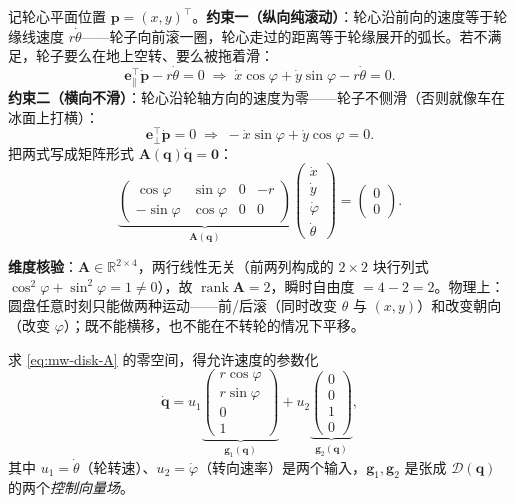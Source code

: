 \begin{derivation}[单轮圆盘的两条纯滚动约束]
记轮心平面位置 $\mathbf{p}=(x,y)^\top$。\textbf{约束一（纵向纯滚动）}：轮心沿前向的速度等于轮缘线速度 $r\dot\theta$——轮子向前滚一圈，轮心走过的距离等于轮缘展开的弧长。若不满足，轮子要么在地上空转、要么被拖着滑：
\begin{equation}
  \mathbf{e}_\parallel^\top\dot{\mathbf{p}}-r\dot\theta=0
  \;\Longrightarrow\;
  \dot x\cos\varphi+\dot y\sin\varphi-r\dot\theta=0.
  \label{eq:mw-disk-roll}
\end{equation}
\textbf{约束二（横向不滑）}：轮心沿轮轴方向的速度为零——轮子不侧滑（否则就像车在冰面上打横）：
\begin{equation}
  \mathbf{e}_\perp^\top\dot{\mathbf{p}}=0
  \;\Longrightarrow\;
  -\dot x\sin\varphi+\dot y\cos\varphi=0.
  \label{eq:mw-disk-noslip}
\end{equation}
把两式写成矩阵形式 $\mathbf{A}(\mathbf{q})\dot{\mathbf{q}}=\mathbf{0}$：
\begin{equation}
  \underbrace{\begin{pmatrix}\cos\varphi&\sin\varphi&0&-r\\-\sin\varphi&\cos\varphi&0&0\end{pmatrix}}_{\mathbf{A}(\mathbf{q})}
  \begin{pmatrix}\dot x\\\dot y\\\dot\varphi\\\dot\theta\end{pmatrix}=\begin{pmatrix}0\\0\end{pmatrix}.
  \label{eq:mw-disk-A}
\end{equation}
\end{derivation}

\noindent\textbf{维度核验}：$\mathbf{A}\in\mathbb{R}^{2\times4}$，两行线性无关（前两列构成的 $2\times2$ 块行列式 $\cos^2\varphi+\sin^2\varphi=1\neq0$），故 $\operatorname{rank}\mathbf{A}=2$，瞬时自由度 $=4-2=2$。物理上：圆盘任意时刻只能做两种运动——前/后滚（同时改变 $\theta$ 与 $(x,y)$）和改变朝向（改变 $\varphi$）；既不能横移，也不能在不转轮的情况下平移。

求 \cref{eq:mw-disk-A} 的零空间，得允许速度的参数化
\begin{equation}
  \dot{\mathbf{q}}=u_1\underbrace{\begin{pmatrix}r\cos\varphi\\r\sin\varphi\\0\\1\end{pmatrix}}_{\mathbf{g}_1(\mathbf{q})}
  +u_2\underbrace{\begin{pmatrix}0\\0\\1\\0\end{pmatrix}}_{\mathbf{g}_2(\mathbf{q})},
  \label{eq:mw-disk-vf}
\end{equation}
其中 $u_1=\dot\theta$（轮转速）、$u_2=\dot\varphi$（转向速率）是两个输入，$\mathbf{g}_1,\mathbf{g}_2$ 是张成 $\mathcal{D}(\mathbf{q})$ 的两个\emph{控制向量场}。

